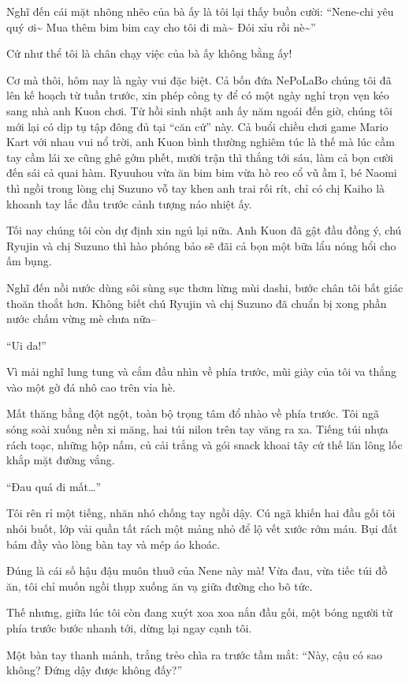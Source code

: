 \documentclass[../main.tex]{subfiles}
\begin{document}
Nghĩ đến cái mặt nhõng nhẽo của bà ấy là tôi lại thấy buồn cười: ``Nene-chi yêu quý ơi\~{} Mua thêm bim bim cay cho tôi đi mà\~{} Đói xỉu rồi nè\~{}''

Cứ như thể tôi là chân chạy việc của bà ấy không bằng ấy!

Cơ mà thôi, hôm nay là ngày vui đặc biệt. Cả bốn đứa NePoLaBo chúng tôi đã lên kế hoạch từ tuần trước, xin phép công ty để có một ngày nghỉ trọn vẹn kéo sang nhà anh Kuon chơi. Từ hồi sinh nhật anh ấy năm ngoái đến giờ, chúng tôi mới lại có dịp tụ tập đông đủ tại ``căn cứ'' này. Cả buổi chiều chơi game Mario Kart với nhau vui nổ trời, anh Kuon bình thường nghiêm túc là thế mà lúc cầm tay cầm lái xe cũng ghê gớm phết, mười trận thì thắng tới sáu, làm cả bọn cười đến sái cả quai hàm. Ryuuhou vừa ăn bim bim vừa hò reo cổ vũ ầm ĩ, bé Naomi thì ngồi trong lòng chị Suzuno vỗ tay khen anh trai rối rít, chỉ có chị Kaiho là khoanh tay lắc đầu trước cảnh tượng náo nhiệt ấy.

Tối nay chúng tôi còn dự định xin ngủ lại nữa. Anh Kuon đã gật đầu đồng ý, chú Ryujin và chị Suzuno thì hào phóng bảo sẽ đãi cả bọn một bữa lẩu nóng hổi cho ấm bụng.

Nghĩ đến nồi nước dùng sôi sùng sục thơm lừng mùi dashi, bước chân tôi bất giác thoăn thoắt hơn. Không biết chú Ryujin và chị Suzuno đã chuẩn bị xong phần nước chấm vừng mè chưa nữa--

``Ui da!''

Vì mải nghĩ lung tung và cắm đầu nhìn về phía trước, mũi giày của tôi va thẳng vào một gờ đá nhô cao trên vỉa hè.

Mất thăng bằng đột ngột, toàn bộ trọng tâm đổ nhào về phía trước. Tôi ngã sóng soài xuống nền xi măng, hai túi nilon trên tay văng ra xa. Tiếng túi nhựa rách toạc, những hộp nấm, củ cải trắng và gói snack khoai tây cứ thế lăn lông lốc khắp mặt đường vắng.

``Đau quá đi mất\dots''

Tôi rên rỉ một tiếng, nhăn nhó chống tay ngồi dậy. Cú ngã khiến hai đầu gối tôi nhói buốt, lớp vải quần tất rách một mảng nhỏ để lộ vết xước rớm máu. Bụi đất bám đầy vào lòng bàn tay và mép áo khoác.

Đúng là cái số hậu đậu muôn thuở của Nene này mà! Vừa đau, vừa tiếc túi đồ ăn, tôi chỉ muốn ngồi thụp xuống ăn vạ giữa đường cho bõ tức.

Thế nhưng, giữa lúc tôi còn đang xuýt xoa xoa nắn đầu gối, một bóng người từ phía trước bước nhanh tới, dừng lại ngay cạnh tôi.

Một bàn tay thanh mảnh, trắng trẻo chìa ra trước tầm mắt: ``Này, cậu có sao không? Đứng dậy được không đấy?''
\end{document}
